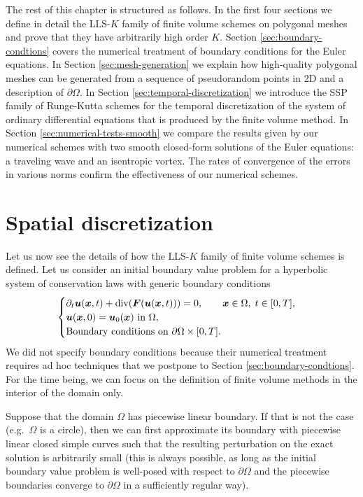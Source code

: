 The rest of this chapter is structured as follows. In the first four sections
we define in detail the LLS-$K$ family of finite volume schemes on polygonal
meshes and prove that they have arbitrarily high order $K$.
Section \ref{sec:boundary-condtions} covers the numerical treatment
of boundary conditions for the Euler equations.
In Section \ref{sec:mesh-generation} we explain how high-quality polygonal
meshes can be generated from a sequence of pseudorandom points in 2D
and a description of $\partial \Omega$.
In Section \ref{sec:temporal-discretization} we introduce the SSP family
of Runge-Kutta schemes for the temporal discretization of the system
of ordinary differential equations that is produced by the finite volume method.
In Section \ref{sec:numerical-tests-smooth} we compare the results given
by our numerical schemes with two smooth closed-form solutions of the Euler equations:
a traveling wave and an isentropic vortex. The rates of convergence
of the errors in various norms confirm the effectiveness of our numerical schemes.

\section{Spatial discretization} \label{sec:spatial-discretization}

Let us now see the details of how the LLS-$K$ family of finite
volume schemes is defined. Let us consider an initial boundary
value problem for a hyperbolic system of conservation laws
with generic boundary conditions
\begin{equation} \label{generic_IVBP}
\begin{cases}
\partial_{t} \bm{u}(\bm{x},t) + \operatorname{div}(\bm{F}(\bm{u}(\bm{x},t))) = 0,
	\qquad \bm{x} \in \Omega, \; t \in [0,T], \\
\bm{u}(\bm{x},0) = \bm{u}_{0}(\bm{x}) \text{ in $\Omega$}, \\
\text{Boundary conditions on $\partial\Omega\times [0,T]$}.
\end{cases}
\end{equation}	
We did not specify boundary conditions because their numerical
treatment requires ad hoc techniques that we postpone to
Section \ref{sec:boundary-condtions}.
For the time being, we can focus on the definition of finite
volume methods in the interior of the domain only.
	
Suppose that the domain $\Omega$ has piecewise linear boundary.
If that is not the case (e.g.\ $\Omega$ is a circle), then we can first
approximate its boundary with piecewise linear closed simple curves
such that the resulting perturbation on the exact solution is arbitrarily
small (this is always possible, as long as the initial boundary value
problem is well-posed with respect to $\partial\Omega$ and the piecewise
boundaries converge to $\partial\Omega$ in a sufficiently regular way).

